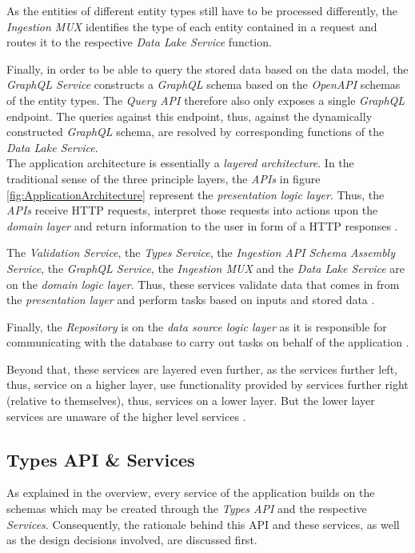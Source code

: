 As the entities of different entity types still have to be processed differently, the \emph{Ingestion MUX} identifies the type of each entity contained in a request and routes it to the respective \emph{Data Lake Service} function.\par 
Finally, in order to be able to query the stored data based on the data model, the \emph{GraphQL Service} constructs a \emph{GraphQL} schema based on the \emph{OpenAPI} schemas of the entity types. The \emph{Query API} therefore also only exposes a single \emph{GraphQL} endpoint. The queries against this endpoint, thus, against the dynamically constructed \emph{GraphQL} schema, are resolved by corresponding functions of the \emph{Data Lake Service}.\\

The application architecture is essentially a \emph{layered architecture}. In the traditional sense of the three principle layers, the \emph{APIs} in figure \ref{fig:ApplicationArchitecture} represent the \emph{presentation logic layer}. Thus, the \emph{APIs} receive HTTP requests, interpret those requests into actions upon the \emph{domain layer} and return information to the user in form of a HTTP responses \cite{AppArchitecture}.\par
The \emph{Validation Service}, the \emph{Types Service}, the \emph{Ingestion API Schema Assembly Service}, the \emph{GraphQL Service}, the \emph{Ingestion MUX} and the \emph{Data Lake Service} are on the \emph{domain logic layer}. Thus, these services validate data that comes in from the \emph{presentation layer} and perform tasks based on inputs and stored data \cite{AppArchitecture}.\par
Finally, the \emph{Repository} is on the \emph{data source logic layer} as it is responsible for communicating with the database to carry out tasks on behalf of the application \cite{AppArchitecture}.\par
Beyond that, these services are layered even further, as the services further left, thus, service on a higher layer, use functionality provided by services further right (relative to themselves), thus, services on a lower layer. But the lower layer services are unaware of the higher level services \cite{AppArchitecture}.

\subsection{Types API \& Services} \label{sec:Types API & Services}
As explained in the overview, every service of the application builds on the schemas which may be created through the \emph{Types API} and the respective \emph{Services}. Consequently, the rationale behind this API and these services, as well as the design decisions involved, are discussed first.\par

